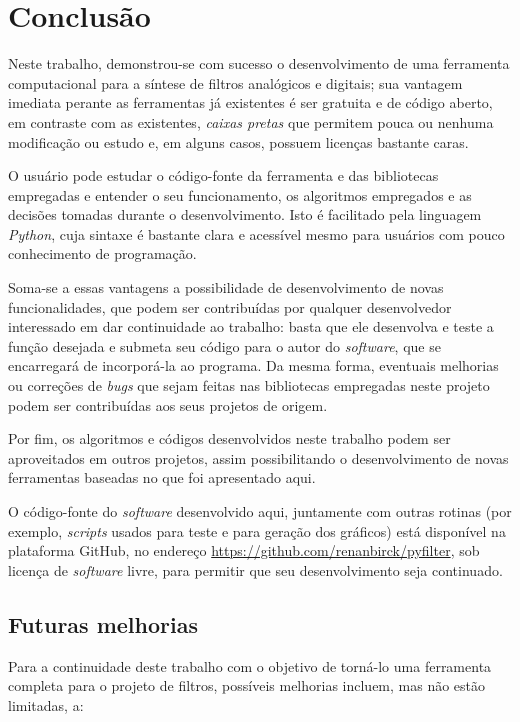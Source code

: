 \chapter{Conclusão}

Neste trabalho, demonstrou-se com sucesso o desenvolvimento de uma ferramenta computacional para a síntese de filtros analógicos e digitais; sua vantagem imediata perante as ferramentas já existentes é ser gratuita e de código aberto, em contraste com as existentes, \textit{caixas pretas} que permitem pouca ou nenhuma modificação ou estudo e, em alguns casos, possuem licenças bastante caras.

O usuário pode estudar o código-fonte da ferramenta e das bibliotecas empregadas e entender o seu funcionamento, os algoritmos empregados e as decisões tomadas durante o desenvolvimento. Isto é facilitado pela linguagem \textit{Python}, cuja sintaxe é bastante clara e acessível mesmo para usuários com pouco conhecimento de programação.

Soma-se a essas vantagens a possibilidade de desenvolvimento de novas funcionalidades, que podem ser contribuídas por qualquer desenvolvedor interessado em dar continuidade ao trabalho: basta que ele desenvolva e teste a função desejada e submeta seu código para o autor do \textit{software}, que se encarregará de incorporá-la ao programa. Da mesma forma, eventuais melhorias ou correções de \textit{bugs} que sejam feitas nas bibliotecas empregadas neste projeto podem ser contribuídas aos seus projetos de origem.

Por fim, os algoritmos e códigos desenvolvidos neste trabalho podem ser aproveitados em outros projetos, assim possibilitando o desenvolvimento de novas ferramentas baseadas no que foi apresentado aqui. 

O código-fonte do \textit{software} desenvolvido aqui, juntamente com outras rotinas (por exemplo, \textit{scripts} usados para teste e para geração dos gráficos) está disponível na plataforma GitHub, no endereço \url{https://github.com/renanbirck/pyfilter}, sob licença de \textit{software} livre, para permitir que seu desenvolvimento seja continuado.

\newpage
\section{Futuras melhorias}
\label{sec:improvements}
Para a continuidade deste trabalho com o objetivo de torná-lo uma ferramenta completa para o projeto de filtros, possíveis melhorias incluem, mas não estão limitadas, a:

